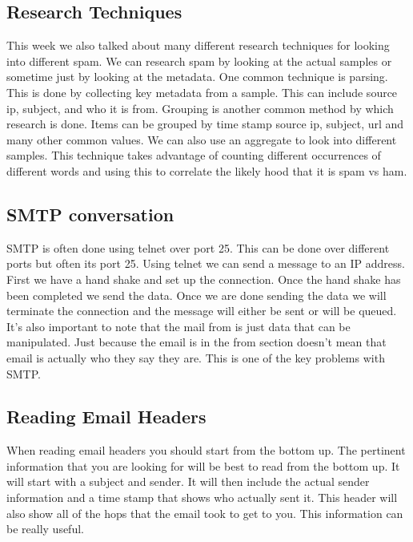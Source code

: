 \documentclass[letterpaper, onecolumn,10pt]{IEEEtran}
\begin{document}
		    \subsection{Research Techniques}
		    This week we also talked about many different research techniques for looking into different spam. We can research spam by looking at the actual samples or sometime just by looking at the metadata. One common technique is parsing. This is done by collecting key metadata from a sample. This can include source ip, subject, and who it is from. Grouping is another common method by which research is done. Items can be grouped by time stamp source ip, subject, url and many other common values. We can also use an aggregate to look into different samples. This technique takes advantage of counting different occurrences of different words and using this to correlate the likely hood that it is spam vs ham.\\
		    
		    \subsection{SMTP conversation}
		    SMTP is often done using telnet over port 25. This can be done over different ports but often its port 25. Using telnet we can send a message to an IP address. First we have a hand shake and set up the connection. Once the hand shake has been completed we send the data. Once we are done sending the data we will terminate the connection and the message will either be sent or will be queued. It's also important to note that the mail from is just data that can be manipulated. Just because the email is in the from section doesn't mean that email is actually who they say they are. This is one of the key problems with SMTP.\\
		    
		    \subsection{Reading Email Headers}
		    When reading email headers you should start from the bottom up. The pertinent information that you are looking for will be best to read from the bottom up. It will start with a subject and sender. It will then include the actual sender information and a time stamp that shows who actually sent it. This header will also show all of the hops that the email took to get to you. This information can be really useful.\\
		    
\end{document}
